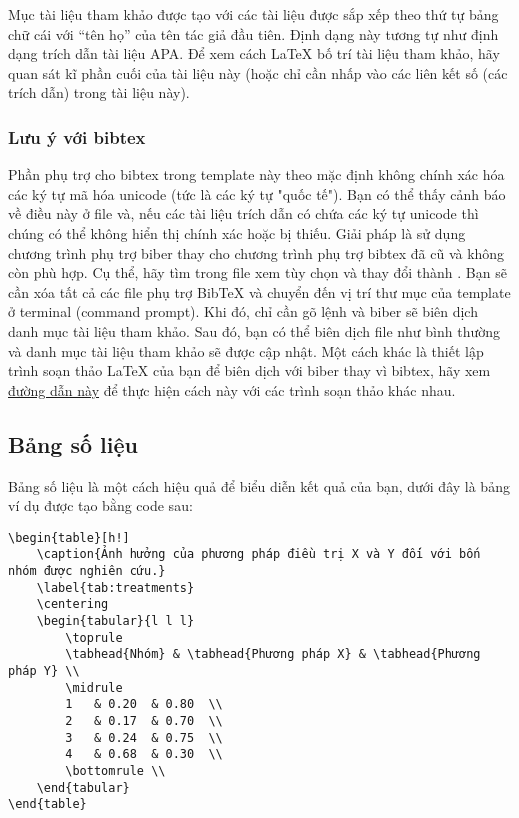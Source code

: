 Mục tài liệu tham khảo được tạo với các tài liệu được sắp xếp theo thứ tự bảng chữ cái với ``tên họ'' của tên tác giả đầu tiên. Định dạng này tương tự như định dạng trích dẫn tài liệu APA. Để xem cách \LaTeX{} bố trí tài liệu tham khảo, hãy quan sát kĩ phần cuối của tài liệu này (hoặc chỉ cần nhấp vào các liên kết số (các trích dẫn) trong tài liệu này).


\subsubsection{Lưu ý với bibtex}

Phần phụ trợ cho bibtex trong template này theo mặc định không chính xác hóa các ký tự mã hóa unicode (tức là các ký tự "quốc tế"). Bạn có thể thấy cảnh báo về điều này ở file  và, nếu các tài liệu trích dẫn có chứa các ký tự unicode thì chúng có thể không hiển thị chính xác hoặc bị thiếu. Giải pháp là sử dụng chương trình phụ trợ biber thay cho chương trình phụ trợ bibtex đã cũ và không còn phù hợp. Cụ thể, hãy tìm trong file  xem tùy chọn  và thay đổi thành . Bạn sẽ cần xóa tất cả các file phụ trợ BibTeX và chuyển đến vị trí thư mục của template ở terminal (command prompt). Khi đó, chỉ cần gõ lệnh  và biber sẽ biên dịch danh mục tài liệu tham khảo. Sau đó, bạn có thể biên dịch file  như bình thường và danh mục tài liệu tham khảo sẽ được cập nhật. Một cách khác là thiết lập trình soạn thảo LaTeX của bạn để biên dịch với biber thay vì bibtex, hãy xem \href{http://tex.stackexchange.com/questions/154751/biblatex-with-biber-configuring-my-editor-to-avoid-undefined-citations/}{đường dẫn này} để thực hiện cách này với các trình soạn thảo khác nhau.


\subsection{Bảng số liệu}

Bảng số liệu là một cách hiệu quả để biểu diễn kết quả của bạn, dưới đây là bảng ví dụ được tạo bằng code sau:
\begin{Verbatim}
\begin{table}[h!]
	\caption{Ảnh hưởng của phương pháp điều trị X và Y đối với bốn nhóm được nghiên cứu.}
	\label{tab:treatments}
	\centering
	\begin{tabular}{l l l}
		\toprule
		\tabhead{Nhóm} & \tabhead{Phương pháp X} & \tabhead{Phương pháp Y} \\
		\midrule
		1	& 0.20	& 0.80	\\
		2	& 0.17	& 0.70	\\
		3	& 0.24	& 0.75	\\
		4	& 0.68	& 0.30	\\
		\bottomrule	\\
	\end{tabular}
\end{table}
\end{Verbatim}

